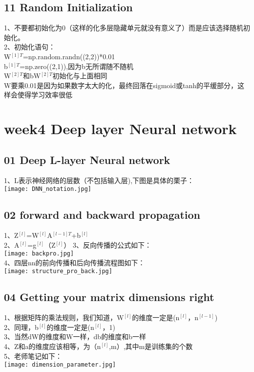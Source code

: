 \documentclass[a4paper,12pt]{article}
\begin{document}
\begin{CJK*}{UTF8}{gbsn}
\subsection{11 Random Initialization}
1、不要都初始化为0（这样的化多层隐藏单元就没有意义了）而是应该选择随机初始化。\\
2、初始化语句：\\
\quad W$^{[1]T}$=np.random.randn((2,2))*0.01\\
\quad b$^{[1]T}$=np.zero((2,1)),因为b无所谓随不随机\\  
W$^{[2]T}$和bW$^{[2]T}$初始化与上面相同\\
W要乘0.01是因为如果数字太大的化，最终回落在sigmoid或tanh的平缓部分，这样会使得学习效率很低\\
\section{week4  Deep layer Neural network}
\subsection{01 Deep L-layer Neural network}
\begin{flushleft}
1、L表示神经网络的层数（不包括输入层),下图是具体的栗子：\\
\texttt{[image: DNN\_notation.jpg]}\\
\end{flushleft}
\subsection{02 forward and backward propagation}
\begin{flushleft}
1、Z$^{[l]}$=W$^{[l]}$A$^{[l-1]T}$+b$^{[l]}$ \\
2、A$^{[l]}$=g$^{[l]}$（Z$^{[l]}$）
3、反向传播的公式如下：\\
\texttt{[image: backpro.jpg]}\\
4、四层nn的前向传播和后向传播流程图如下：\\
\texttt{[image: structure\_pro\_back.jpg]}\\
\subsection{04 Getting your matrix dimensions right}
\begin{flushleft}
1、根据矩阵的乘法规则，我们知道，W$^{[l]}$的维度一定是(n$^{[l]}$，n$^{[l-1]}$)\\
2、同理，b$^{[l]}$的维度一定是(n$^{[l]}$，1)\\
3、当然dW的维度和W一样，db的维度和b一样\\
4、Z和a的维度应该相等，为（n$^{[l]}$,m）,其中m是训练集的个数\\
5、老师笔记如下：\\
\texttt{[image: dimension\_parameter.jpg]}
\end{flushleft}

\end{flushleft}
\end{CJK*}
\end{document}
